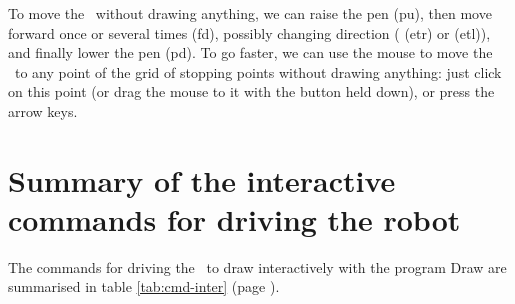 To move the \robot\ without drawing anything, we can raise the pen
 ({\idt pu}), then move forward once or several times
 ({\idt fd}), possibly changing direction
( ({\idt etr}) or  ({\idt etl})), and finally lower
the pen  ({\idt pd}). To go faster, we can use
the mouse to move the \robot\ to any point of the grid
of stopping points without drawing anything: just click on this point (or
drag the mouse to it with the button held down), or press the arrow keys.


\clearpage
\section*{Summary of the interactive commands \newline for driving the robot}

The commands for driving the \robot\ to draw interactively
with the program {\idt Draw} are summarised in table \ref{tab:cmd-inter}
(page \pageref{tab:cmd-inter}).

